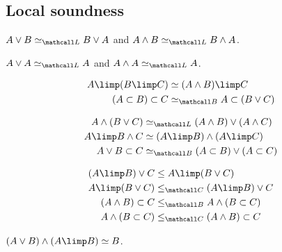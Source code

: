 \subsection{Local soundness}

\begin{lemma}[Commutativity]
  $A \lor B \semequiv_{\Lattice} B \lor A$ and $A \land B \semequiv_{\Lattice} B \land A$.
\end{lemma}

\begin{lemma}[Idempotency]
  $A \lor A \semequiv_{\Lattice} A$ and $A \land A \semequiv_{\Lattice} A$.
\end{lemma}

\begin{lemma}[Currying]
  \begin{align*}
    A \limp (B \limp C) &\semequiv (A \land B) \limp C \\
    (A \lsub B) \lsub C &\semequiv_{\Brouwer} A \lsub (B \lor C)
  \end{align*}
\end{lemma}

\begin{lemma}[Distributivity]
  \begin{align*}
    A \land (B \lor C) &\semequiv_{\Lattice} (A \land B) \lor (A \land C) \\
    A \limp B \land C &\semequiv (A \limp B) \land (A \limp C) \\
    A \lor B \lsub C &\semequiv_{\Brouwer} (A \lsub B) \lor (A \lsub C)
  \end{align*}
\end{lemma}

\begin{lemma}
  \begin{align*}
    (A \limp B) \lor C &\sement A \limp (B \lor C) \\
    A \limp (B \lor C) &\sementC (A \limp B) \lor C \\
    (A \land B) \lsub C &\sementB A \land (B \lsub C) \\
    A \land (B \lsub C) &\sementC (A \land B) \lsub C
  \end{align*}
\end{lemma}

\begin{lemma}
  $(A \lor B) \land (A \limp B) \semequiv B$.
\end{lemma}

